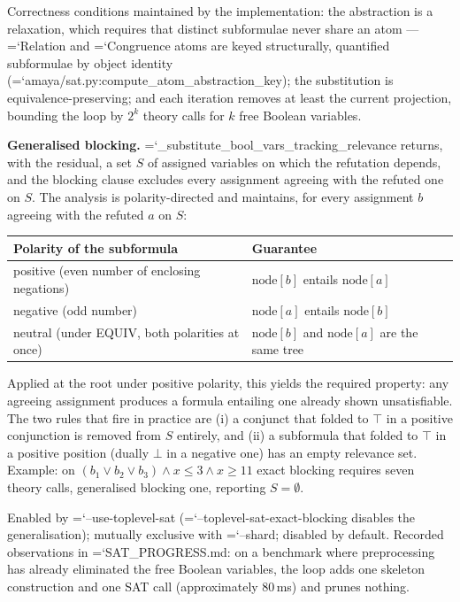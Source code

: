 \documentclass[10pt,a4paper]{article}
\newcommand{\code}[1]{{\small\ttfamily\hyphenchar\font=`\-\relax #1}}
\begin{document}
Correctness conditions maintained by the implementation: the abstraction is a relaxation, which requires
that distinct subformulae never share an atom --- \code{Relation} and \code{Congruence} atoms are keyed
structurally, quantified subformulae by object identity
(\code{amaya/sat.py:\allowbreak compute\_\allowbreak atom\_\allowbreak abstraction\_\allowbreak key}); the substitution is equivalence-preserving; and
each iteration removes at least the current projection, bounding the loop by $2^k$ theory calls for $k$
free Boolean variables.

\textbf{Generalised blocking.}  \code{\_\allowbreak substitute\_\allowbreak bool\_\allowbreak vars\_\allowbreak tracking\_\allowbreak relevance} returns, with the
residual, a set $S$ of assigned variables on which the refutation depends, and the blocking clause
excludes every assignment agreeing with the refuted one on $S$.  The analysis is polarity-directed and
maintains, for every assignment $b$ agreeing with the refuted $a$ on $S$:

\begin{center}
\begin{tabular}{ll}
\toprule
Polarity of the subformula & Guarantee \\
\midrule
positive (even number of enclosing negations) & $\text{node}[b]$ entails $\text{node}[a]$ \\
negative (odd number) & $\text{node}[a]$ entails $\text{node}[b]$ \\
neutral (under EQUIV, both polarities at once) & $\text{node}[b]$ and $\text{node}[a]$ are the same tree \\
\bottomrule
\end{tabular}
\end{center}

Applied at the root under positive polarity, this yields the required property: any agreeing assignment
produces a formula entailing one already shown unsatisfiable.  The two rules that fire in practice are
(i) a conjunct that folded to $\top$ in a positive conjunction is removed from $S$ entirely, and (ii) a
subformula that folded to $\top$ in a positive position (dually $\bot$ in a negative one) has an empty
relevance set.  Example: on
$(b_1 \vee b_2 \vee b_3) \wedge x \leq 3 \wedge x \geq 11$ exact blocking requires seven theory calls,
generalised blocking one, reporting $S = \emptyset$.

Enabled by \code{--use-toplevel-sat} (\code{--toplevel-sat-exact-blocking} disables the
generalisation); mutually exclusive with \code{--shard}; disabled by default.  Recorded observations in
\code{SAT\_PROGRESS.md}: on a benchmark where preprocessing has already eliminated the free Boolean
variables, the loop adds one skeleton construction and one SAT call (approximately 80\,ms) and prunes
nothing.
\end{document}
